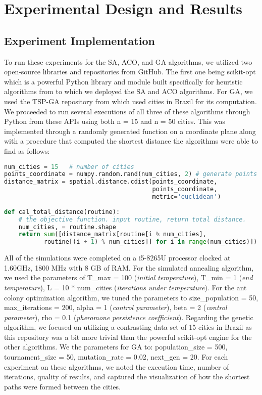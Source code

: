 \documentclass{article}
\begin{document}
\section{Experimental Design and Results}
\subsection{Experiment Implementation}
To run these experiments for the SA, ACO, and GA algorithms, we utilized two open-source libraries and repositories from GitHub. The first one being scikit-opt which is a powerful Python library and module built specifically for heuristic algorithms from \cite{guofei} to which we deployed the SA and ACO algorithms. For GA, we used the TSP-GA repository from \cite{lccasagrande} which used cities in Brazil for its computation. We proceeded to run several executions of all three of these algorithms through Python from these APIs using both n = 15 and n = 50 cities. This was implemented through a randomly generated function on a coordinate plane along with a procedure that computed the shortest distance the algorithms were able to find as follows: \\

\begin{mdframed}
\begin{lstlisting}[language=Python]
num_cities = 15   # number of cities
points_coordinate = numpy.random.rand(num_cities, 2) # generate points
distance_matrix = spatial.distance.cdist(points_coordinate, 
                                         points_coordinate, 
                                         metric='euclidean')
                                         
def cal_total_distance(routine):
    # the objective function. input routine, return total distance.
    num_cities, = routine.shape
    return sum([distance_matrix[routine[i % num_cities], 
           routine[(i + 1) % num_cities]] for i in range(num_cities)]) 
\end{lstlisting}
\end{mdframed}

All of the simulations were completed on a i5-8265U processor clocked at 1.60GHz, 1800 MHz with 8 GB of RAM. For the simulated annealing algorithm, we used the parameters of T\_max = 100 (\textit{initial temperature}), T\_min = 1 (\textit{end temperature}), L = 10 * num\_cities (\textit{iterations under temperature}). For the ant colony optimization algorithm, we tuned the parameters to size\_population = 50, max\_iterations = 200, alpha = 1 (\textit{control parameter}), beta = 2 (\textit{control parameter}), rho = 0.1 (\textit{pheromone persistence coefficient}). Regarding the genetic algorithm, we focused on utilizing a contrasting data set of 15 cities in Brazil as this repository was a bit more trivial than the powerful scikit-opt engine for the other algorithms. We the parameters for GA to: population\_size = 500, tournament\_size = 50, mutation\_rate = 0.02, next\_gen = 20. For each experiment on these algorithms, we noted the execution time, number of iterations, quality of results, and captured the visualization of how the shortest paths were formed between the cities. 
\end{document}
